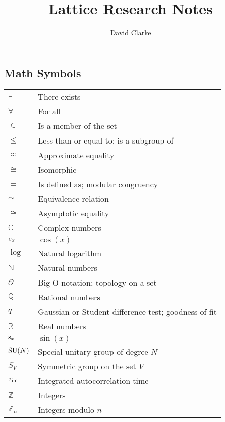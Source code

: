 \documentclass[12pt]{book}
\title{\bf Lattice Research Notes}
\author{David Clarke}
\theoremstyle{definition}
\newenvironment{frontstuff}
  {\centering\chapter*{}}
  {\clearpage}
\begin{document}
\frontmatter                            %
\maketitle                              %

\begin{frontstuff} %

\section*{Math Symbols}
\begin{tabular}{ll}
$\exists$       & There exists \\
$\forall$       & For all \\
$\in$           & Is a member of the set \\
$\leq$          & Less than or equal to; is a subgroup of\\
$\approx$       & Approximate equality \\
$\cong$         & Isomorphic\\
$\equiv$        & Is defined as; modular congruency \\
$\sim$          & Equivalence relation \\
$\simeq$        & Asymptotic equality \\
$\mathbb{C}$    & Complex numbers \\
$\operatorname{c}_x$         & $\cos(x)$ \\
$\log$          & Natural logarithm \\
$\mathbb{N}$    & Natural numbers \\
$\mathcal{O}$   & Big O notation; topology on a set \\ 
$\mathbb{Q}$    & Rational numbers \\
$q$             & Gaussian or Student difference test; goodness-of-fit \\
$\mathbb{R}$    & Real numbers \\
$\operatorname{s}_x$          & $\sin(x)$ \\
$\operatorname{SU}(N)$        & Special unitary group of degree $N$ \\
$S_V$           & Symmetric group on the set $V$ \\
$\tau_\text{int}$       & Integrated autocorrelation time \\
$\mathbb{Z}$    & Integers \\
$\mathbb{Z}_n$  & Integers modulo $n$ \\
\end{tabular}
\clearpage


\end{frontstuff}
\end{document}
